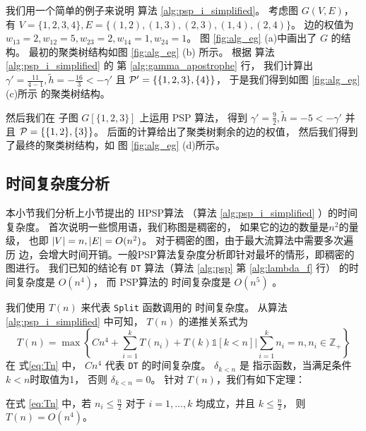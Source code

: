 \begin{example}
	我们用一个简单的例子来说明
  算法 \ref{alg:psp_i_simplified}。
  考虑图 $G(V, E)$，有 $V=\{1,2,3,4\}, E=\{(1,2),(1,3),(2,3),(1,4),(2,4)\}$。
  边的权值为 $w_{13}=2, w_{12}=5, w_{23}=2, w_{14}=1, w_{24}=1$。
	图 \ref{fig:alg_eg} (a)中画出了 $G$
  的结构。
  最初的聚类树结构如图 \ref{fig:alg_eg} (b)
  所示。
  根据 
  算法 \ref{alg:psp_i_simplified} 的
  第 \ref{alg:gamma_apostrophe} 行，
  我们计算出 $\gamma' = \frac{11}{4-1}, \tilde{h} = -\frac{16}{3} < -\gamma' $
  且 $\P' = \{\{1,2,3\},\{4\}\}$，
  于是我们得到如图 \ref{fig:alg_eg} (c)所示
  的聚类树结构。
	
	然后我们在 子图 $G[\{1,2,3\}]$ 上运用 PSP 算法，
  得到 $\gamma' = \frac{9}{2}, \tilde{h} = -5 < -\gamma'$
  并且 $\P= \{\{1,2\},\{3\}\}$。 
  后面的计算给出了聚类树剩余的边的权值，
  然后我们得到了最终的聚类树结构，如
  图 \ref{fig:alg_eg} (d)所示。
\end{example}	
\subsection{时间复杂度分析}

本小节我们分析上小节提出的 HPSP算法 （算法 \ref{alg:psp_i_simplified} ）的时间复杂度。
首次说明一些惯用语，我们称图是稠密的，
如果它的边的数量是$n^2$的量级，
也即 $\abs{V} = n, \abs{E} = O(n^2)$。
对于稠密的图，由于最大流算法中需要多次遍历
边，会增大时间开销。一般PSP算法复杂度分析即针对最坏的情形，即稠密的图进行。
我们已知的结论有 \texttt{DT} 算法（算法 \ref{alg:psp} 第 \ref{alg:lambda_f} 行）
的时间复杂度是 $O(n^4)$， 而 PSP算法的 
时间复杂度是 $O(n^5)$ \citep{chan2017pin}。

我们使用 $T(n)$ 来代表 
\texttt{Split} 函数调用的
时间复杂度。
从算法 \ref{alg:psp_i_simplified} 中可知，
$T(n)$ 的递推关系式为
\begin{equation}\label{eq:Tn}
T(n) = \max \left\{ C n^4 + \sum_{i=1}^k T(n_i) +
T(k)\mathds{1}[k<n] \Big|
\sum_{i=1}^k n_i = n, n_i \in \mathbb{Z}_{+} \right\}
\end{equation}
在 式\eqref{eq:Tn} 中，
$Cn^4$ 代表 \texttt{DT} 的时间复杂度。
$\delta_{k<n}$ 是 指示函数，当满足条件 $k<n$时取值为1，
否则 $\delta_{k<n}=0$。
针对 $T(n)$，我们有如下定理：
\begin{theorem}\label{thm:alg_complexity}
  在式 \eqref{eq:Tn} 中，若 $n_i \leq \frac{n}{2}$ 对于 $i=1,\dots,k$ 均成立，并且
   $ k \leq \frac{n}{2}$， 
   则 $T(n) = O(n^4)$。
\end{theorem}

